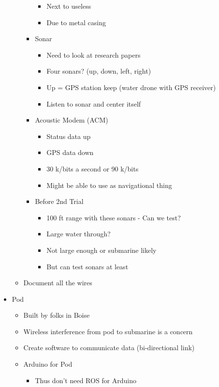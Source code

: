 \documentclass[12pt]{article}
\begin{document}
\begin{itemize}
\begin{itemize}
\begin{itemize}
\begin{itemize}
							\item Next to useless
							\item Due to metal casing
						\end{itemize}
						\item Sonar
						\begin{itemize}
							\item Need to look at research papers
							\item Four sonars? (up, down, left, right)
							\item Up = GPS station keep (water drone with GPS receiver)
							\item Listen to sonar and center itself
						\end{itemize}
						\item Acoustic Modem (ACM)
						\begin{itemize}
							\item Status data up
							\item GPS data down
							\item 30 k/bits a second or 90 k/bits
							\item Might be able to use as navigational thing
						\end{itemize}
						\item Before 2nd Trial
						\begin{itemize}
							\item 100 ft range with these sonars - Can we test?
							\item Large water through?
							\item Not large enough or submarine likely
							\item But can test sonars at least
						\end{itemize}
					\end{itemize}
					\item Document all the wires
				\end{itemize}
				\item Pod
				\begin{itemize}
					\item Built by folks in Boise
					\item Wireless interference from pod to submarine is a concern
					\item Create software to communicate data (bi-directional link)
					\item Arduino for Pod
					\begin{itemize}
						\item Thus don't need ROS for Arduino

\end{itemize}
\end{itemize}
\end{itemize}
\end{document}
